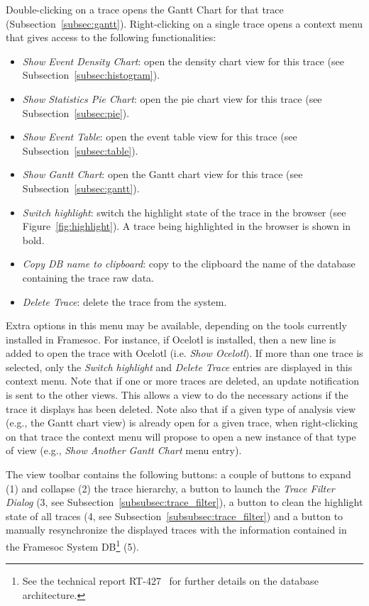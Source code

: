 \documentclass[twoside]{article}
\begin{document}
\begin{sloppypar}
Double-clicking on a trace opens the Gantt Chart for that trace (Subsection~\ref{subsec:gantt}).
Right-clicking on a single trace opens a context menu that gives access to the following functionalities:
\begin{itemize}
 \item \emph{Show Event Density Chart}: open the density chart view for this trace (see Subsection~\ref{subsec:histogram}).
 \item \emph{Show Statistics Pie Chart}: open the pie chart view for this trace (see Subsection~\ref{subsec:pie}).
 \item \emph{Show Event Table}: open the event table view for this trace (see Subsection~\ref{subsec:table}).
 \item \emph{Show Gantt Chart}: open the Gantt chart view for this trace (see Subsection~\ref{subsec:gantt}).
 \item \emph{Switch highlight}: switch the highlight state of the trace in the browser (see Figure~\ref{fig:highlight}). A trace being highlighted in the browser is shown in bold.
 \item \emph{Copy DB name to clipboard}: copy to the clipboard the name of the database containing the trace raw data.
 \item \emph{Delete Trace}: delete the trace from the system.
\end{itemize}
Extra options in this menu may be available, depending on the tools currently installed in Framesoc. For instance, if Ocelotl is installed, then a new line is added to open the trace with Ocelotl (i.e. \emph{Show Ocelotl}).
If more than one trace is selected, only the \emph{Switch highlight} and \emph{Delete Trace} entries are displayed in this context menu.
Note that if one or more traces are deleted, an update notification is sent to the other views.
This allows a view to do the necessary actions if the trace it displays has been deleted.
Note also that if a given type of analysis view (e.g., the Gantt chart view) is already open for a given trace, when right-clicking on that trace the context menu will propose to open a new instance of that type of view (e.g., \emph{Show Another Gantt Chart} menu entry).

The view toolbar contains the following buttons: a couple of buttons to expand (\num{1}) and collapse (\num{2}) the trace hierarchy, a button to launch the \emph{Trace Filter Dialog} (\num{3}, see Subsection~\ref{subsubsec:trace_filter}), a button to clean the highlight state of all traces (\num{4}, see Subsection~\ref{subsubsec:trace_filter}) and a button to manually resynchronize the displayed traces with the information contained in the Framesoc System DB\footnote{See the technical report RT-427~\cite{pagano:hal} for further details on the database architecture.} (\num{5}).


\end{sloppypar}
\end{document}
